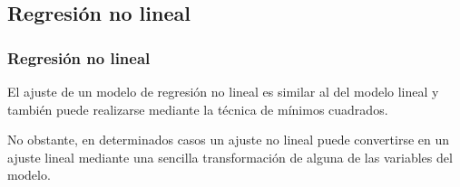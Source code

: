 \subsection{Regresión no lineal}
\begin{frame}
\frametitle{Regresión no lineal}
El ajuste de un modelo de regresión no lineal es similar al del modelo lineal y también puede realizarse mediante la técnica de mínimos
cuadrados.
 
No obstante, en determinados casos un ajuste no lineal puede convertirse en un ajuste lineal mediante una sencilla transformación de alguna
de las variables del modelo.

\end{frame}


